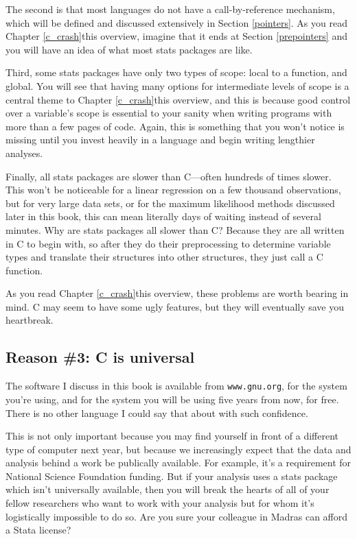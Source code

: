The second is that most languages do not have a call-by-reference
mechanism, which will be defined and discussed extensively in Section
\ref{pointers}. As you read \ifbook Chapter \ref{c_crash}\else this overview\fi, imagine that it ends
at Section \ref{prepointers} and you will have an idea of what most
stats packages are like.

Third, some stats packages have only two types of scope: local to
a function, and global. You will see that having many options for
intermediate levels of scope is a central theme to \ifbook Chapter \ref{c_crash}\else this overview\fi,
and this is because good control over a variable's scope is essential
to your sanity when writing programs with more than a few pages of
code. Again, this is something that you won't notice is missing until
you invest heavily in a language and begin writing lengthier analyses.

Finally, all stats packages are slower than C---often hundreds of times
slower. This won't be noticeable for a linear regression on a few thousand
observations, but for very large data sets, or for the maximum likelihood
methods discussed later in this book, this can mean literally days of
waiting instead of several minutes.  Why are stats packages all slower
than C? Because they are all written in C to begin with, so after they
do their preprocessing to determine variable types and translate their
structures into other structures, they just call a C function.

As you read \ifbook Chapter \ref{c_crash}\else this overview\fi, these
problems are worth bearing in mind. C may seem to have some ugly
features, but they will eventually save you heartbreak.

\subsection{Reason \#3: C is universal} 
The software I discuss in this book is available from {\tt www.gnu.org}, for the
system you're using, and for the system you will be using five years from now, for
free. There is no other language I could say that about with such confidence.

This is not only important because you may find yourself in front of
a different type of computer next year, but because we increasingly
expect that the data and analysis behind a work be publically available.
For example, it's a requirement for National Science Foundation funding. But if your analysis uses
a stats package which isn't universally available, then you will break
the hearts of all of your fellow researchers who want to work with your analysis
but for whom it's logistically impossible to do so. Are you sure your
colleague in Madras can afford a Stata license?


